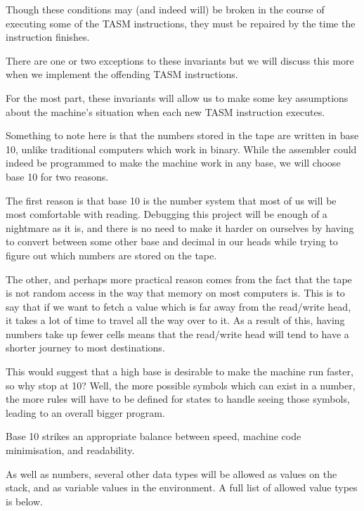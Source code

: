 Though these conditions may (and indeed will) be broken in the course of executing some of the TASM instructions, they must be repaired by the time the instruction finishes.

There are one or two exceptions to these invariants but we will discuss this more when we implement the offending TASM instructions.

For the most part, these invariants will allow us to make some key assumptions about the machine's situation when each new TASM instruction executes.

Something to note here is that the numbers stored in the tape are written in base 10, unlike traditional computers which work in binary. While the assembler could indeed be programmed to make the machine work in any base, we will choose base 10 for two reasons.

The first reason is that base 10 is the number system that most of us will be most comfortable with reading. Debugging this project will be enough of a nightmare as it is, and there is no need to make it harder on ourselves by having to convert between some other base and decimal in our heads while trying to figure out which numbers are stored on the tape.

The other, and perhaps more practical reason comes from the fact that the tape is not random access in the way that memory on most computers is. This is to say that if we want to fetch a value which is far away from the read/write head, it takes a lot of time to travel all the way over to it. As a result of this, having numbers take up fewer cells means that the read/write head will tend to have a shorter journey to most destinations.

This would suggest that a high base is desirable to make the machine run faster, so why stop at 10? Well, the more possible symbols which can exist in a number, the more rules will have to be defined for states to handle seeing those symbols, leading to an overall bigger program.

Base 10 strikes an appropriate balance between speed, machine code minimisation, and readability.

As well as numbers, several other data types will be allowed as values on the stack, and as variable values in the environment. A full list of allowed value types is below.

